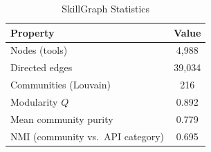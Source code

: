 \begin{table}[!t]
\caption{SkillGraph Statistics}
\label{tab:graph_stats}
\centering
\small
\begin{tabular}{lc}
\toprule
\textbf{Property} & \textbf{Value} \\
\midrule
Nodes (tools)            & 4,988 \\
Directed edges           & 39,034 \\
Communities (Louvain)    & 216 \\
Modularity $Q$           & 0.892 \\
Mean community purity    & 0.779 \\
NMI (community vs.\ API category) & 0.695 \\
\bottomrule
\end{tabular}
\end{table}
